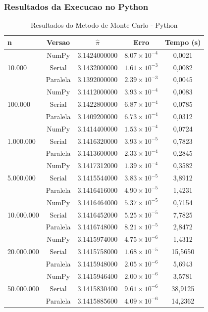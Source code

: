 \documentclass[12pt, a4paper]{article}
\begin{document}
	\subsubsection{Resultados da Execucao no Python}
	
	\begin{table}[H]
		\centering
		\caption{Resultados do Metodo de Monte Carlo - Python}
		\label{tab:python_mc}
		\begin{tabular}{lcccc}
			\toprule
			\textbf{n} & \textbf{Versao} & \textbf{$\hat{\pi}$} & \textbf{Erro} & \textbf{Tempo (s)} \\
			\midrule
			\multirow{3}{*}{10.000} & NumPy    & 3.1424000000 & $8.07\times10^{-4}$ & 0,0021 \\
			& Serial   & 3.1432000000 & $1.61\times10^{-3}$ & 0,0082 \\
			& Paralela & 3.1392000000 & $2.39\times10^{-3}$ & 0,0045 \\
			\midrule
			\multirow{3}{*}{100.000} & NumPy    & 3.1412000000 & $3.93\times10^{-4}$ & 0,0083 \\
			& Serial   & 3.1422800000 & $6.87\times10^{-4}$ & 0,0785 \\
			& Paralela & 3.1409200000 & $6.73\times10^{-4}$ & 0,0312 \\
			\midrule
			\multirow{3}{*}{1.000.000} & NumPy    & 3.1414400000 & $1.53\times10^{-4}$ & 0,0724 \\
			& Serial   & 3.1416320000 & $3.93\times10^{-5}$ & 0,7823 \\
			& Paralela & 3.1413600000 & $2.33\times10^{-4}$ & 0,2845 \\
			\midrule
			\multirow{3}{*}{5.000.000} & NumPy    & 3.1417312000 & $1.39\times10^{-4}$ & 0,3582 \\
			& Serial   & 3.1415544000 & $3.83\times10^{-5}$ & 3,8912 \\
			& Paralela & 3.1416416000 & $4.90\times10^{-5}$ & 1,4231 \\
			\midrule
			\multirow{3}{*}{10.000.000} & NumPy    & 3.1416464000 & $5.37\times10^{-5}$ & 0,7154 \\
			& Serial   & 3.1416452000 & $5.25\times10^{-5}$ & 7,7825 \\
			& Paralela & 3.1416748000 & $8.21\times10^{-5}$ & 2,8472 \\
			\midrule
			\multirow{3}{*}{20.000.000} & NumPy    & 3.1415974000 & $4.75\times10^{-6}$ & 1,4312 \\
			& Serial   & 3.1415758000 & $1.68\times10^{-5}$ & 15,5650 \\
			& Paralela & 3.1415948000 & $2.05\times10^{-6}$ & 5,6943 \\
			\midrule
			\multirow{3}{*}{50.000.000} & NumPy    & 3.1415946400 & $2.00\times10^{-6}$ & 3,5781 \\
			& Serial   & 3.1415830400 & $9.61\times10^{-6}$ & 38,9125 \\
			& Paralela & 3.1415885600 & $4.09\times10^{-6}$ & 14,2362 \\
			\bottomrule
		\end{tabular}
	\end{table}
	
\end{document}
